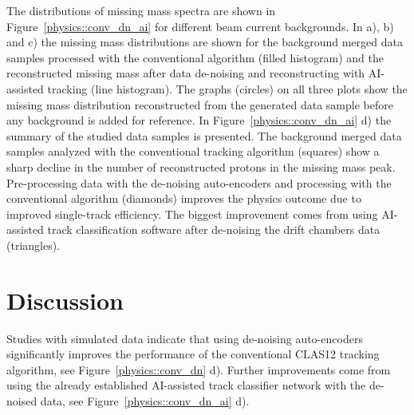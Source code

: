 The distributions of missing mass spectra are shown in Figure~\ref{physics::conv_dn_ai} for different beam current backgrounds.
In a), b) and c) the missing mass distributions are shown for the background merged data samples processed with the conventional algorithm 
(filled histogram) and the reconstructed missing mass after data de-noising and reconstructing with AI-assisted tracking (line histogram).
The graphs (circles) on all three plots show the missing mass distribution reconstructed from the generated data sample 
before any background is added for reference. In Figure~\ref{physics::conv_dn_ai} d) the summary of the studied data samples 
is presented. The background merged data samples analyzed with the conventional tracking algorithm (squares) show a sharp decline in
the number of reconstructed protons in the missing mass peak. Pre-processing data with the de-noising auto-encoders and processing
with the conventional algorithm (diamonds) improves the physics outcome due to improved single-track efficiency. The biggest improvement
comes from using AI-assisted track classification software after de-noising the drift chambers data (triangles). 


\section{Discussion}

Studies with simulated data indicate that using de-noising auto-encoders significantly improves the performance
of the conventional CLAS12 tracking algorithm, see Figure~\ref{physics::conv_dn} d). Further improvements come from using
the already established AI-assisted track classifier network with the de-noised data, see Figure~\ref{physics::conv_dn_ai} d).

